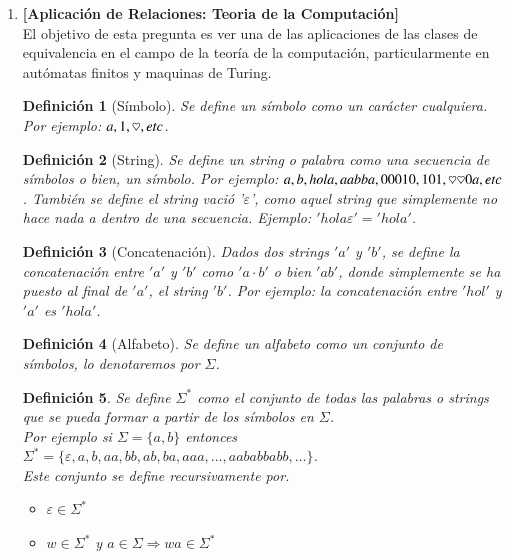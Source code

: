\documentclass[letterpaper,10pt]{article}
\newcommand{\heart}{\ensuremath\heartsuit}
\theoremstyle{plain}
\newtheorem{defi}{Definición}[section]
\begin{document}
\begin{enumerate}[\bf P1.]
    \item \textbf{[Aplicación de Relaciones: Teoria de la Computación]} \\    El objetivo de esta pregunta es ver una de las aplicaciones de las clases de equivalencia en el campo de la teoría de la computación, particularmente en autómatas finitos y maquinas de Turing.
        
        \begin{multicols}{2}
        \begin{defi}[Símbolo]
        Se define un símbolo como un carácter cualquiera. Por ejemplo: $a,1,\heart,etc$. 
        \end{defi}
        
        \begin{defi}[String]
            Se define un string o palabra como una secuencia de símbolos o bien, un símbolo. Por ejemplo: $a,b,hola,aabba,00010,101,\heart \heart 0a,etc$.
            También se define el string vació '$\varepsilon$', como aquel string que simplemente no hace nada a dentro de una secuencia. Ejemplo: $'hola\varepsilon'='hola'$.
        \end{defi}
        
        \begin{defi}[Concatenación]
        Dados dos strings $'a'$ y $'b'$, se define la concatenación entre $'a'$ y $'b'$ como $'a\cdot b'$ o bien $'ab'$, donde simplemente se ha puesto al final de $'a'$, el string $'b'$. Por ejemplo: la concatenación entre $'hol'$ y $'a'$ es $'hola'$. 
        \end{defi}
        
        \begin{defi}[Alfabeto] 
        Se define un alfabeto como un conjunto de símbolos, lo denotaremos por $\Sigma$.
        \end{defi}
        
        \begin{defi}
        Se define $\Sigma^*$ como el conjunto de todas las palabras o strings que se pueda formar a partir de los símbolos en $\Sigma$.\\
        Por ejemplo si $\Sigma=\{a,b\}$ entonces $\Sigma^*=\{\varepsilon, a,b,aa,bb,ab,ba,aaa,\dots, aababbabb,\dots \}$.\\
        Este conjunto se define recursivamente por.
            \begin{itemize}
                \item $\varepsilon \in \Sigma^*$
                \item $w \in \Sigma^*$ y $a \in \Sigma \Rightarrow wa\in \Sigma^*$
            \end{itemize}
        \end{defi}
        

\end{multicols}
\end{enumerate}
\end{document}
